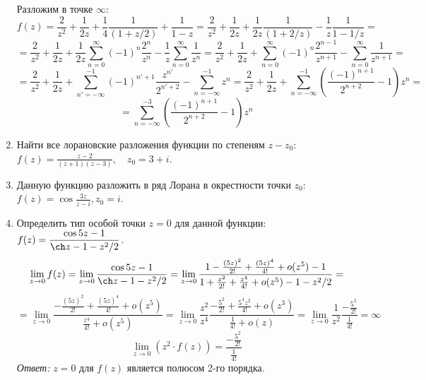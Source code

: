 \documentclass[14pt, a4paper, titlepage, fleqn]{extarticle}
\newcommand{\otv}{\textit{Ответ:} }
\begin{document}
\begin{enumerate}
        Разложим в точке \( \infty \):
        \[
            f(z) = \frac{2}{z^2} + \frac{1}{2 z} + \frac{1}{4} \frac{1}{(1 + z/2)} + \frac{1}{1 - z} =
            \frac{2}{z^2} + \frac{1}{2 z} + \frac{1}{2z} \frac{1}{(1 + 2/z)} - \frac{1}{z} \frac{1}{1 - 1/z} =
        \]
        \[
            = \frac{2}{z^2} + \frac{1}{2 z} + \frac{1}{2z} \sum_{n=0}^\infty (-1)^n \frac{2^n}{z^n} - \frac{1}{z} \sum_{n=0}^\infty \frac{1}{z^n} 
            = \frac{2}{z^2} + \frac{1}{2 z} + \sum_{n=0}^\infty (-1)^n \frac{2^{n-1}}{z^{n+1}} - \sum_{n=0}^\infty \frac{1}{z^{n+1}} =
        \]
        \[
            = \frac{2}{z^2} + \frac{1}{2 z} + \sum_{n'=-\infty}^{-1} (-1)^{n'+1} \frac{z^{n'} }{2^{n'+2}} - \sum_{n=-\infty}^{-1} z^n
            = \frac{2}{z^2} + \frac{1}{2 z} + \sum_{n=-\infty}^{-1} \left( \frac{(-1)^{n+1}}{2^{n+2}} - 1 \right) z^n =
        \]
        \[
            = \sum_{n=-\infty}^{-3} \left( \frac{(-1)^{n+1}}{2^{n+2}} - 1 \right) z^n
        \]

        \item Найти все лорановские разложения функции по степеням \( z - z_0 \): \( \displaystyle f(z) = \frac{z-2}{(z+1)(z-3)}, \quad z_0 = 3+i \).  
        

        \item Данную функцию разложить в ряд Лорана в окрестности точки \( z_0 \): \( \displaystyle f(z) = \cos \frac{3z}{z-i}, z_0 = i \).
        


        \item Определить тип особой точки \( z = 0 \) для данной функции: \( \displaystyle f(z) = \frac{\cos 5z -1 }{\ch z - 1 - z^2/2} \).
        \[
            \lim\limits_{z\to 0} f(z) = \lim\limits_{z\to 0} \frac{\cos 5z -1 }{\ch z - 1 - z^2/2} =
            \lim\limits_{z\to 0} \frac{1 - \frac{(5z)^2}{2!} + \frac{(5z)^4}{4!} + o(z^5) -1 }{1 + \frac{z^2}{2!} + \frac{z^4}{4!} + o(z^5) - 1 - z^2/2} =
        \]
        \[
            = \lim\limits_{z\to 0} \frac{-\frac{(5z)^2}{2!} + \frac{(5z)^4}{4!} + o(z^5)}{\frac{z^4}{4!} + o(z^5)} = 
            \lim\limits_{z\to 0} \frac{z^2}{z^4} \frac{-\frac{5^2}{2!} + \frac{5^4 z^2}{4!} + o(z^3)}{\frac{1}{4!} + o(z)} = 
            \lim\limits_{z\to 0} \frac{1}{z^2} \frac{-\frac{5^2}{2!}}{\frac{1}{4!}} = \infty
        \]
        \[
            \lim\limits_{z\to 0} \left( z^2 \cdot f(z) \right) = \frac{-\frac{5^2}{2!}}{\frac{1}{4!}}
        \]
        \otv \( z = 0 \) для \( f(z) \) является полюсом 2-го порядка.


\end{enumerate}
\end{document}
